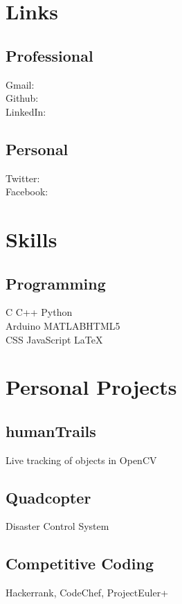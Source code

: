 \documentclass[]{deedy-resume-openfont}
\begin{document}
\begin{minipage}[t]{0.33\textwidth}
\section{Links}
\subsection{Professional}
Gmail: \href{mailto:akostuv@gmail.com}{}\\
Github: \href{https://github.com/akostuv}{} \\
LinkedIn: \href{https://www.linkedin.com/in/akostuv}{} \\
\sectionsep
\subsection{Personal}
Twitter: \href{https://twitter.com/akostuv}{} \\
Facebook: \href{https://facebook.com/akostuv}{} \\
\sectionsep


\section{Skills}
\subsection{Programming}
C \textbullet{} C++ \textbullet{} Python \\
Arduino \textbullet{}MATLAB\textbullet{}HTML5 \\ CSS \textbullet{} JavaScript \textbullet{} \LaTeX
\sectionsep

\section{Personal Projects}
\subsection{humanTrails}
Live tracking of objects in OpenCV
\vspace{\topsep}
\subsection{Quadcopter}
Disaster Control System
\vspace{\topsep}
\subsection{Competitive Coding}
Hackerrank, CodeChef, ProjectEuler+
%
%

\end{minipage} 
\end{document}
